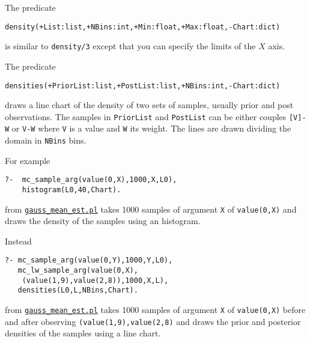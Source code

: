 The predicate
\begin{verbatim}
density(+List:list,+NBins:int,+Min:float,+Max:float,-Chart:dict) 
\end{verbatim}
is similar to \verb|density/3| except that you can specify the limits of the $X$ axis.

The predicate
\begin{verbatim}
densities(+PriorList:list,+PostList:list,+NBins:int,-Chart:dict)
\end{verbatim}
draws a line chart of the density of two sets of samples, usually
 prior and post observations. The samples in \verb|PriorList| and \verb|PostList|
can be either couples \verb|[V]-W| or \verb|V-W| where \verb|V| is a value and \verb|W| its weight.
 The lines are drawn dividing the domain in
 \verb|NBins| bins.
 
For example
\begin{verbatim}
?-  mc_sample_arg(value(0,X),1000,X,L0),
    histogram(L0,40,Chart).
\end{verbatim}
from \href{http://cplint.lamping.unife.it/example/inference/gauss_mean_est.pl}{\texttt{gauss\_mean\_est.pl}}
takes 1000 samples of argument \verb|X| of \verb|value(0,X)| and draws the density of the samples using an histogram.

Instead
\begin{verbatim}
?- mc_sample_arg(value(0,Y),1000,Y,L0),
   mc_lw_sample_arg(value(0,X),
    (value(1,9),value(2,8)),1000,X,L),
   densities(L0,L,NBins,Chart).
\end{verbatim}
from \href{http://cplint.lamping.unife.it/example/inference/gauss_mean_est.pl}{\texttt{gauss\_mean\_est.pl}}
takes 1000 samples of argument \verb|X| of \verb|value(0,X)| before and after observing
\verb|(value(1,9),value(2,8)| and draws the prior and posterior densities of the samples using a line chart.
